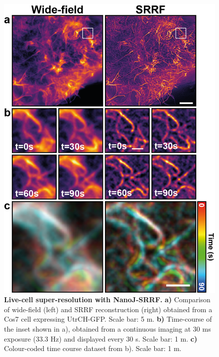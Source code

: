 \begin{figure}[!t]
    \centering
    \includegraphics[width=\linewidth]{Figures/Figure4_v3.png}
    \caption{\textbf{Live-cell super-resolution with NanoJ-SRRF.} \textbf{a)} Comparison of wide-field (left) and SRRF reconstruction (right) obtained from a Cos7 cell expressing UtrCH-GFP. Scale bar: 5 \micro m. \textbf{b)} Time-course of the inset shown in a), obtained from  a continuous imaging at 30 ms exposure (33.3 Hz) and displayed every 30 s. Scale bar: 1 \micro m. \textbf{c)} Colour-coded time course dataset from b). Scale bar: 1 \micro m.}
    \label{fig:SRRF}
\end{figure}
 
